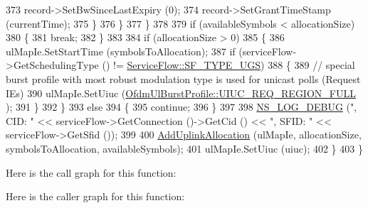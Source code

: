 \begin{DoxyCode}
373                   record->SetBwSinceLastExpiry (0);
374                   record->SetGrantTimeStamp (currentTime);
375                 \}
376             \}
377         \}
378 
379       \textcolor{keywordflow}{if} (availableSymbols < allocationSize)
380         \{
381           \textcolor{keywordflow}{break};
382         \}
383 
384       \textcolor{keywordflow}{if} (allocationSize > 0)
385         \{
386           ulMapIe.SetStartTime (symbolsToAllocation);
387           \textcolor{keywordflow}{if} (serviceFlow->GetSchedulingType () != \hyperlink{classns3_1_1ServiceFlow_a7990ba10be1e098328fd1e6382a26235a969e0b62fa12fef1dbb23913744ed594}{ServiceFlow::SF\_TYPE\_UGS})
388             \{
389               \textcolor{comment}{// special burst profile with most robust modulation type is used for unicast polls (Request
       IEs)}
390               ulMapIe.SetUiuc (\hyperlink{classns3_1_1OfdmUlBurstProfile_ae528783c4b3c6700ff49dfd7a555cb3daae074d10caa7fe18da973227c7f9942f}{OfdmUlBurstProfile::UIUC\_REQ\_REGION\_FULL}
      );
391             \}
392         \}
393       \textcolor{keywordflow}{else}
394         \{
395           \textcolor{keywordflow}{continue};
396         \}
397 
398       \hyperlink{group__logging_ga413f1886406d49f59a6a0a89b77b4d0a}{NS\_LOG\_DEBUG} (\textcolor{stringliteral}{", CID: "} << serviceFlow->GetConnection ()->GetCid () << \textcolor{stringliteral}{", SFID: "} << 
      serviceFlow->GetSfid ());
399 
400       \hyperlink{classns3_1_1UplinkSchedulerSimple_a078c18f311ce90cbceab11a54cd4606e}{AddUplinkAllocation} (ulMapIe, allocationSize, symbolsToAllocation, 
      availableSymbols);
401       ulMapIe.SetUiuc (uiuc);
402     \}
403 \}
\end{DoxyCode}


Here is the call graph for this function\+:




Here is the caller graph for this function\+:


